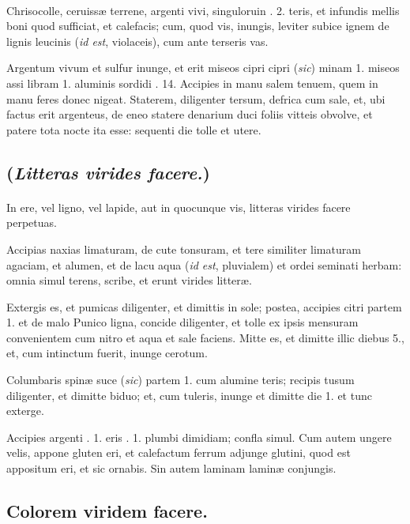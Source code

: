 \documentclass[a4paper, 11pt, oneside, polutonikogreek, italian]{article}
\begin{document}
\paragraph{}
Chrisocolle, ceruissæ terrene, argenti vivi, singuloruin \roundz. 2. teris, et infundis mellis boni quod sufficiat, et calefacis; cum, quod vis, inungis, leviter subice ignem de lignis leucinis (\emph{id est}, violaceis), cum ante terseris vas.

Argentum vivum et sulfur inunge, et erit miseos cipri cipri (\emph{sic}) minam 1. miseos assi libram 1. aluminis sordidi \roundz. 14. Accipies in manu salem tenuem, quem in manu feres donec nigeat. Staterem, diligenter tersum, defrica cum sale, et, ubi factus erit argenteus, de eneo statere denarium duci foliis vitteis obvolve, et patere tota nocte ita esse: sequenti die tolle et utere.

\subsection{(\emph{Litteras virides facere.})}
\paragraph{}
In ere, vel ligno, vel lapide, aut in quocunque vis, litteras virides facere perpetuas.

Accipias naxias limaturam, de cute tonsuram, et tere similiter limaturam agaciam, et alumen, et de lacu aqua (\emph{id est}, pluvialem) et ordei seminati herbam: omnia simul terens, scribe, et erunt virides litteræ.

Extergis es, et pumicas diligenter, et dimittis in sole; postea, accipies citri partem 1. et de malo Punico ligna, concide diligenter, et tolle ex ipsis mensuram convenientem cum nitro et aqua et sale faciens. Mitte es, et dimitte illic diebus 5., et, cum intinctum fuerit, inunge cerotum.

Columbaris spinæ suce (\emph{sic}) partem 1. cum alumine teris; recipis tusum diligenter, et dimitte biduo; et, cum tuleris, inunge et dimitte die 1. et tunc exterge.

Accipies argenti \roundz. 1. eris \roundz. 1. plumbi dimidiam; confla simul. Cum autem ungere velis, appone gluten eri, et calefactum ferrum adjunge glutini, quod est appositum eri, et sic ornabis. Sin autem laminam laminæ conjungis.

\subsection{Colorem viridem facere.}
\end{document}
